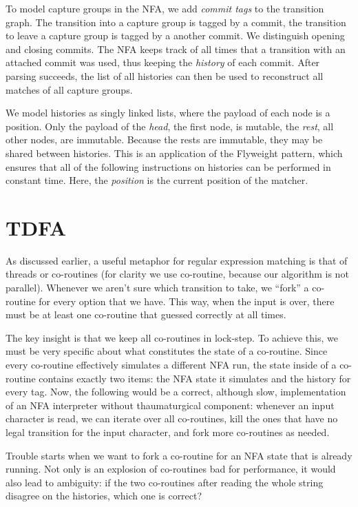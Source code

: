 \documentclass[11pt,a4paper,twoside,openright]{Thesis}
\theoremstyle{definition}
\newcommand{\seclabel}[1]{\label{sec:#1}}
\begin{document}
To model capture groups in the NFA, we add \emph{commit tags} to
the transition graph. The transition into a capture group is tagged
by a commit, the transition to leave a capture group is tagged by
a another commit. We distinguish opening and closing commits. The
NFA keeps track of all times that a transition with an attached
commit was used, thus keeping the \emph{history} of each commit.
After parsing succeeds, the list of all histories can then be used
to reconstruct all matches of all capture groups.

We model histories as singly linked lists, where the payload of each node is a
position.  Only the payload of the \emph{head}, the first node, is mutable, the
\emph{rest}, all other nodes, are immutable.  Because the rests are immutable,
they may be shared between histories.  This is an application of the Flyweight
pattern, which ensures that all of the following instructions on histories can
be performed in constant time. Here, the \emph{position} is the current
position of the matcher.

\section{TDFA}	\seclabel{dfa}

As discussed earlier, a useful metaphor for regular expression matching is that of 
threads\cite{Cox07a} or co-routines (for clarity we use 
co-routine, because our algorithm is not parallel).
Whenever we aren't sure which transition to take,
we ``fork'' a co-routine for every option that we have. This way, when
the input is over, there must be at least one co-routine that guessed
correctly at all times. 

The key insight is that we keep all co-routines in lock-step. To achieve this,
we must be very specific about what constitutes the state of a co-routine.
Since every co-routine effectively simulates a different NFA run, the state
inside of a co-routine contains exactly two items: the NFA state it simulates
and the history for every tag. Now, the following would be a correct, although
slow, implementation of an NFA interpreter without thaumaturgical component:
whenever an input character is read, we can iterate over all co-routines, kill
the ones that have no legal transition for the input character, and fork more
co-routines as needed.

Trouble starts when we want to fork a co-routine for an NFA state that
is already running. Not only is an explosion of co-routines bad for
performance, it would also lead to ambiguity: if the two co-routines
after reading the whole string disagree on the histories, which one is correct?
\end{document}
